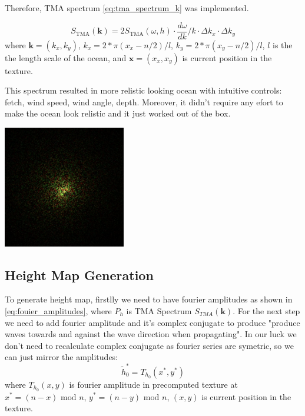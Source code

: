 Therefore, TMA spectrum \ref{eq:tma_spectrum_k} was implemented.

$$
    S_{\text{TMA}}(\mathbf{k}) = 2S_{\text{TMA}}(\omega, h) \cdot \frac{d\omega}{dk} / k \cdot \Delta k_x \cdot \Delta k_y
$$
where $\mathbf{k} = (k_x, k_y)$, $k_x = 2 * \pi (x_x - n/2)/ l$, $k_y = 2 * \pi (x_y - n/2)/ l$, $l$ is the the length scale of the ocean, 
and $\mathbf{x} = (x_x, x_y)$ is current position in the texture. 

This spectrum resulted in more relistic looking ocean with intuitive controls: fetch, wind speed, wind angle, depth. Moreover, it didn't require any efort to make the ocean look relistic and it just worked out of the box.

\begin{minipage}{1\textwidth}
    \centering
    \includegraphics[width=0.40\textwidth]{"images/tma_spectrum.png"}
    \label{fig:tma_spectrum}
\end{minipage}

\subsection{Height Map Generation}

To generate height map, firstlly we need to have fourier amplitudes as shown in \ref{eq:fouier_amplitudes}, where $P_h$ is TMA Spectrum $S_{TMA}(\mathbf{k})$.
For the next step we need to add fourier amplitude and it's complex conjugate to produce "produce waves towards and against the wave direction when propagating"\cite{horvath2015}.
In our luck we don't need to recalculate complex conjugate as fourier series are symetric, so we can just mirror the amplitudes:
\begin{equation}
    \tilde{h}^{*}_0 = T_{h_0}(x^{*}, y^{*})
\end{equation}
where $T_{h_0}(x, y)$ is fourier amplitude in precomputed texture at $x^{*} = (n - x) \text{ mod } n$, $y^{*} = (n - y) \text{ mod } n$, $(x, y)$ is current position in the texture.

